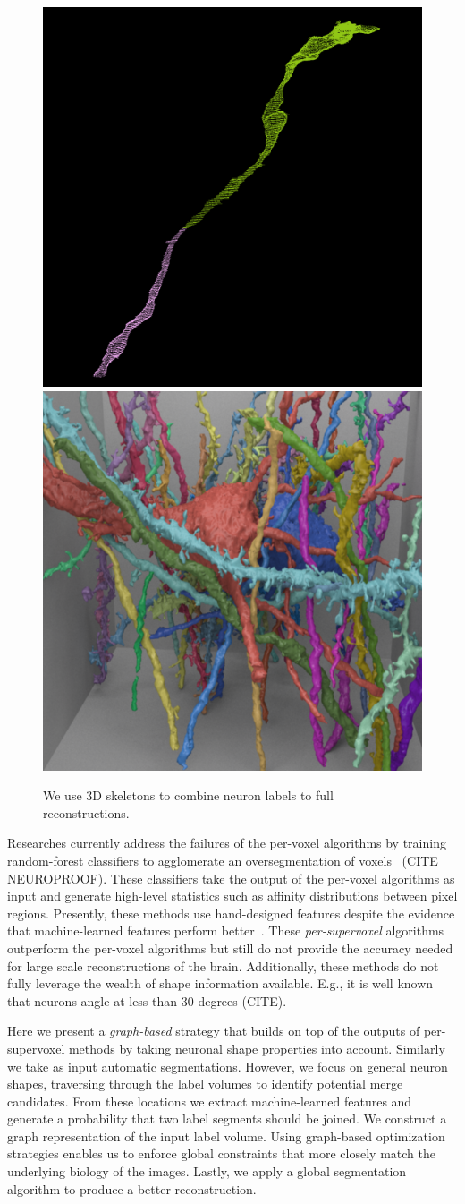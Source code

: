 \begin{figure}
	\centering
	\includegraphics[width=0.42\linewidth]{./figures/merge_candidate1.png}
	\hspace{0.085\linewidth}
	\includegraphics[width=0.42\linewidth]{./figures/intro-cube.png}
	\caption{We use 3D skeletons to combine neuron labels to full reconstructions.}
\end{figure}

Researches currently address the failures of the per-voxel algorithms by training random-forest classifiers to agglomerate an oversegmentation of voxels~\cite{nunez2014graph} (CITE NEUROPROOF). 
These classifiers take the output of the per-voxel algorithms as input and generate high-level statistics such as affinity distributions between pixel regions. 
Presently, these methods use hand-designed features despite the evidence that machine-learned features perform better~\cite{bogovic2013learned}. 
These \textit{per-supervoxel} algorithms outperform the per-voxel algorithms but still do not provide the accuracy needed for large scale reconstructions of the brain.
Additionally, these methods do not fully leverage the wealth of shape information available.  E.g., it is well known that neurons angle at less than $30$ degrees (CITE). %

Here we present a \textit{graph-based} strategy that builds on top of the outputs of per-supervoxel methods by taking neuronal shape properties into account. 
Similarly we take as input automatic segmentations. 
However, we focus on general neuron shapes, traversing through the label volumes to identify potential merge candidates. 
From these locations we extract machine-learned features and generate a probability that two label segments should be joined. 
We construct a graph representation of the input label volume. 
Using graph-based optimization strategies enables us to enforce global constraints that more closely match the underlying biology of the images.
Lastly, we apply a global segmentation algorithm to produce a better reconstruction.




